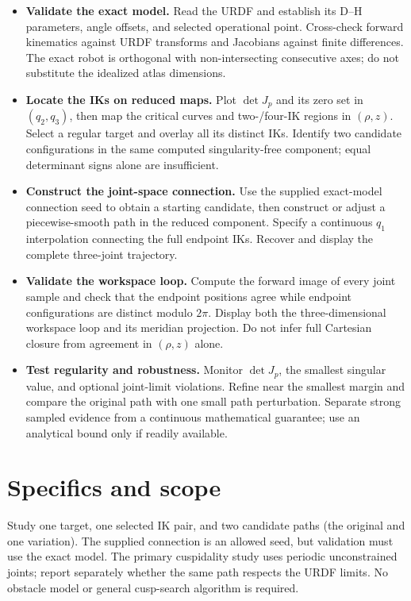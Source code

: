 \documentclass[11pt,a4paper]{article}
\begin{document}
\begin{itemize}
  \item \textbf{Validate the exact model.} Read the URDF and establish its D--H
parameters, angle offsets, and selected operational point. Cross-check forward
kinematics against URDF transforms and Jacobians against finite differences. The exact robot is
orthogonal with non-intersecting consecutive axes; do not substitute the
idealized atlas dimensions.

  \item \textbf{Locate the IKs on reduced maps.} Plot $\det J_p$ and its zero set
in $(q_2,q_3)$, then map the critical curves and two-/four-IK regions in
$(\rho,z)$. Select a regular target and overlay all its distinct IKs. Identify
two candidate configurations in the same computed singularity-free component;
equal determinant signs alone are insufficient.

  \item \textbf{Construct the joint-space connection.} Use the supplied
exact-model connection seed to obtain a starting candidate, then construct
or adjust a piecewise-smooth path in the reduced component. Specify a continuous
$q_1$ interpolation connecting the full endpoint IKs. Recover and display the
complete three-joint trajectory.

  \item \textbf{Validate the workspace loop.} Compute the forward image of every
joint sample and check that the endpoint positions agree while endpoint
configurations are distinct modulo $2\pi$. Display both the three-dimensional
workspace loop and its meridian projection. Do not infer full Cartesian
closure from agreement in $(\rho,z)$ alone.

  \item \textbf{Test regularity and robustness.} Monitor $\det J_p$, the smallest
singular value, and optional joint-limit violations. Refine near the smallest
margin and compare the original path with one small path perturbation.
Separate strong sampled evidence from a continuous mathematical guarantee;
use an analytical bound only if readily available.
\end{itemize}

\newpage
\section*{Specifics and scope}
Study one target, one selected IK pair, and two candidate paths (the
original and one variation). The supplied connection is an allowed
seed, but validation must use the exact model. The primary cuspidality study
uses periodic unconstrained joints; report separately whether the same path
respects the URDF limits. No obstacle model or general cusp-search algorithm
is required.
\end{document}
